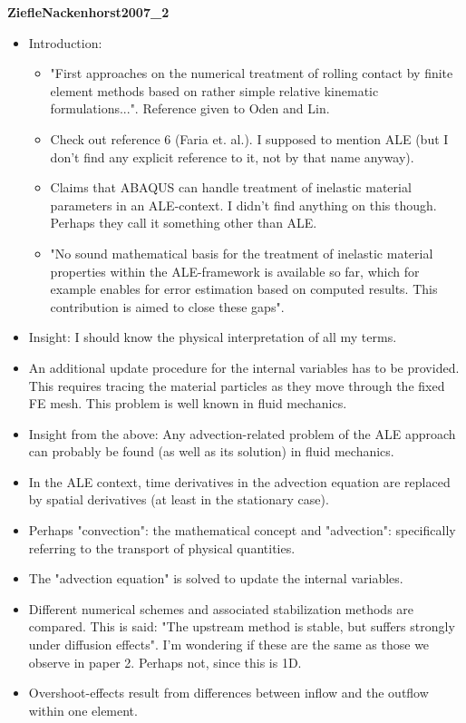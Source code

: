 \documentclass{article}
\begin{document}
\textbf{ZiefleNackenhorst2007\_2}
\begin{itemize}
\item Introduction:
\begin{itemize}
\item "First approaches on the numerical treatment of rolling contact by finite element methods based on rather simple relative kinematic formulations...". Reference given to Oden and Lin.
\item Check out reference 6 (Faria et. al.). I supposed to mention ALE (but I don't find any explicit reference to it, not by that name anyway).
\item Claims that ABAQUS can handle treatment of inelastic material parameters in an ALE-context. I didn't find anything on this though. Perhaps they call it something other than ALE.
\item "No sound mathematical basis for the treatment of inelastic material properties within the ALE-framework is available so far, which for example enables for error estimation based on computed results. This contribution is aimed to close these gaps".
\end{itemize}
\item Insight: I should know the physical interpretation of all my terms.
\item An additional update procedure for the internal variables has to be provided. This requires tracing the material particles as they move through the fixed FE mesh. This problem is well known in fluid mechanics. 
\item Insight from the above: Any advection-related problem of the ALE approach can probably be found (as well as its solution) in fluid mechanics.
\item In the ALE context, time derivatives in the advection equation are replaced by spatial derivatives (at least in the stationary case).
\item Perhaps "convection": the mathematical concept and "advection": specifically referring to the transport of physical quantities.
\item The "advection equation" is solved to update the internal variables.
\item Different numerical schemes and associated stabilization methods are compared. This is said: "The upstream method is stable, but suffers strongly under diffusion effects". I'm wondering if these are the same as those we observe in paper 2. Perhaps not, since this is 1D.
\item Overshoot-effects result from differences between inflow and the outflow within one element.

\end{itemize}
\end{document}
